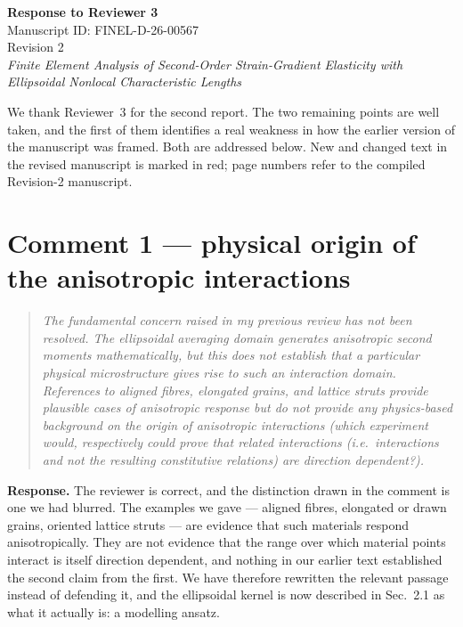 \documentclass[12pt,a4paper]{article}
\begin{document}
\begin{center}
{\Large\bfseries Response to Reviewer 3}\\[2pt]
Manuscript ID: FINEL-D-26-00567\\[2pt]
Revision 2\\[4pt]
\textit{Finite Element Analysis of Second-Order Strain-Gradient Elasticity with\\ Ellipsoidal Nonlocal Characteristic Lengths}
\end{center}

\vspace{0.3cm}

We thank Reviewer~3 for the second report. The two remaining points are well taken, and the first of them identifies a real weakness in how the earlier version of the manuscript was framed. Both are addressed below. New and changed text in the revised manuscript is marked in red; page numbers refer to the compiled Revision-2 manuscript.

\vspace{0.2cm}

\section*{Comment 1 --- physical origin of the anisotropic interactions}

\begin{quote}\small\itshape
The fundamental concern raised in my previous review has not been resolved. The ellipsoidal averaging domain generates anisotropic second moments mathematically, but this does not establish that a particular physical microstructure gives rise to such an interaction domain. References to aligned fibres, elongated grains, and lattice struts provide plausible cases of anisotropic response but do not provide any physics-based background on the origin of anisotropic interactions (which experiment would, respectively could prove that related interactions (i.e.\ interactions and not the resulting constitutive relations) are direction dependent?).
\end{quote}

\textbf{Response.} The reviewer is correct, and the distinction drawn in the comment is one we had blurred. The examples we gave --- aligned fibres, elongated or drawn grains, oriented lattice struts --- are evidence that such materials respond anisotropically. They are not evidence that the range over which material points interact is itself direction dependent, and nothing in our earlier text established the second claim from the first. We have therefore rewritten the relevant passage instead of defending it, and the ellipsoidal kernel is now described in Sec.~2.1 as what it actually is: a modelling ansatz.
\end{document}
